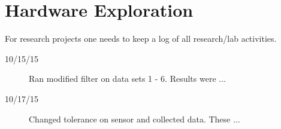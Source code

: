 

\chapter{Hardware Exploration}

For research projects one needs to keep a log of all research/lab activities.   


\begin{description}
\item [10/15/15]  Ran modified filter on data sets 1 - 6.  Results were ...
\item [10/17/15]  Changed tolerance on sensor and collected data.  These ...
\end{description}